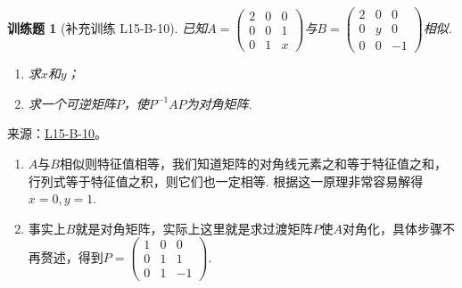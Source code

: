 \documentclass[12pt,fontset=fandol]{ctexart}
\newtheorem{exercise}{训练题}[section]
\begin{document}
\begin{exercise}[补充训练 L15-B-10]\label{prob:L15-B-10}
已知$A=\begin{pmatrix}
                2 & 0 & 0 \\ 0 & 0 & 1 \\ 0 & 1 & x
            \end{pmatrix}$与$B=\begin{pmatrix}
                2 & 0 & 0 \\ 0 & y & 0 \\ 0 & 0 & -1
            \end{pmatrix}$相似.
        \begin{enumerate}
            \item 求$x$和$y$；

            \item 求一个可逆矩阵$P$，使$P^{-1}AP$为对角矩阵.
        \end{enumerate}
\end{exercise}
\noindent 来源：\href{https://github.com/yhwu-is/Linear-Algebra-Left-Undone/blob/new/%E8%AE%B2%E4%B9%89/%E4%B8%93%E9%A2%98/15%20%E7%9B%B8%E4%BC%BC%E6%A0%87%E5%87%86%E5%BD%A2%EF%BC%9A%E5%A4%8D%E6%95%B0%E5%9F%9F%E4%B8%8A%E7%9A%84%E5%B0%9D%E8%AF%95%E4%B8%8E%E7%90%86%E8%AE%BA.tex}{L15-B-10}。
\begin{solve}
\begin{enumerate}
                \item $A$与$B$相似则特征值相等，我们知道矩阵的对角线元素之和等于特征值之和，行列式等于特征值之积，则它们也一定相等. 根据这一原理非常容易解得$x=0,y=1$.

                \item 事实上$B$就是对角矩阵，实际上这里就是求过渡矩阵$P$使$A$对角化，具体步骤不再赘述，得到$P=\begin{pmatrix}
                              1 & 0 & 0 \\ 0 & 1 & 1 \\ 0 & 1 & -1
                          \end{pmatrix}$.
            \end{enumerate}
\end{solve}
\end{document}
